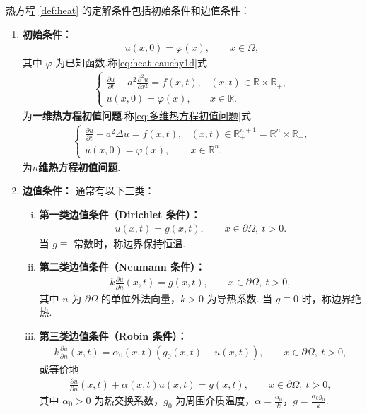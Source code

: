 \documentclass[../main.tex]{subfiles} %
\begin{document}
\begin{definition}
热方程 \eqref{def:heat} 的定解条件包括初始条件和边值条件：
\begin{enumerate}[(1)]
\item \textbf{初始条件：}
\begin{align*}
u(x,0)=\varphi(x),\qquad x\in\Omega,
\end{align*}
其中 $\varphi$ 为已知函数.称\eqref{eq:heat-cauchy1d}式
\begin{align}
\begin{cases}
\frac{\partial u}{\partial t} - a^2\frac{\partial^2 u}{\partial x^2} = f(x,t), & (x,t)\in\mathbb{R}\times\mathbb{R}_+, \\
u(x,0)=\varphi(x), & x\in\mathbb{R}.
\end{cases} \label{eq:heat-cauchy1d}
\end{align}
为\textbf{一维热方程初值问题}.称\eqref{eq:多维热方程初值问题}式
\begin{align}\label{eq:多维热方程初值问题}
\begin{cases}
\frac{\partial u}{\partial t}-a^2\Delta u=f(x,t), & (x,t)\in\mathbb{R}_+^{n+1}=\mathbb{R}^n\times\mathbb{R}_+,\\
u(x,0)=\varphi(x), & x\in\mathbb{R}^n.
\end{cases}
\end{align}
为\textbf{$n$维热方程初值问题}.

\item \textbf{边值条件：} 通常有以下三类：
\begin{enumerate}[(i)]
\item \textbf{第一类边值条件（Dirichlet 条件）：}
\begin{align*}
u(x,t)=g(x,t),\qquad x\in\partial\Omega,\ t>0.
\end{align*}
当 $g\equiv$ 常数时，称边界保持恒温.

\item \textbf{第二类边值条件（Neumann 条件）：}
\begin{align*}
k\frac{\partial u}{\partial n}(x,t)=g(x,t),\qquad x\in\partial\Omega,\ t>0,
\end{align*}
其中 $n$ 为 $\partial\Omega$ 的单位外法向量，$k>0$ 为导热系数. 当 $g\equiv 0$ 时，称边界绝热.

\item \textbf{第三类边值条件（Robin 条件）：}
\begin{align*}
k\frac{\partial u}{\partial n}(x,t)=\alpha_0(x,t)(g_0(x,t)-u(x,t)),\qquad x\in\partial\Omega,\ t>0,
\end{align*}
或等价地
\begin{align*}
\frac{\partial u}{\partial n}(x,t)+\alpha(x,t)u(x,t)=g(x,t),\qquad x\in\partial\Omega,\ t>0,
\end{align*}
其中 $\alpha_0>0$ 为热交换系数，$g_0$ 为周围介质温度，$\alpha=\frac{\alpha_0}{k}$，$g=\frac{\alpha_0 g_0}{k}$.
\end{enumerate}
\end{enumerate}
\end{definition}
\end{document}
